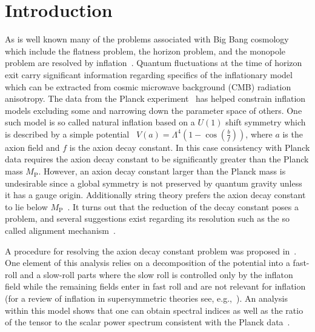 \documentclass[12pt]{article}
\begin{document}
\section{Introduction \label{sec:Introduction}}
As is well known many of the problems associated with Big Bang cosmology which include
the flatness problem, the horizon problem, and the monopole problem are resolved by inflation~\cite{Guth:1980zm, Starobinsky:1980te, Linde:1981mu, Albrecht:1982wi, Sato:1980yn, Linde:1983gd}.
Quantum fluctuations at the time of horizon exit carry significant information regarding specifics of the inflationary model~\cite{Mukhanov:1981xt, Hawking:1982cz, Starobinsky:1982ee, Guth:1982ec, Bardeen:1983qw, Cheung:2007st} which can be extracted from cosmic microwave background (CMB) radiation anisotropy.
The data from the Planck experiment~\cite{Adam:2015rua, Ade:2015lrj, Array:2015xqh} has helped constrain inflation models excluding some and narrowing down the parameter space of others.
One such model is so called natural inflation based on a $U(1)$ shift symmetry which is described by a simple potential~\cite{Freese:1990rb, Adams:1992bn} $V\left(a\right) = \Lambda^4 \left(1 - \cos(\frac{b}{f})\right)$, where $a$ is the axion field and $f$ is the axion decay constant.
In this case consistency with Planck data requires the axion decay constant to be significantly greater than the Planck mass $M_\text{P}$.
However, an axion decay constant larger than the Planck mass is undesirable since a global symmetry is not preserved by quantum gravity unless it has a gauge origin.
Additionally string theory prefers the axion decay constant to lie below $M_\text{P}$~\cite{Banks:2003sx, Svrcek:2006yi}.
It turns out that the reduction of the decay constant poses a problem, and several suggestions exist regarding its resolution such as the so called alignment mechanism~\cite{Kim:2004rp, Long:2014dta}.

A procedure for resolving the axion decay constant problem was proposed in~\cite{Nath:2017ihp}.
One element of this analysis relies on a decomposition of the potential into a fast-roll and a slow-roll parts where the slow roll is controlled only by the inflaton field while the remaining fields enter in fast roll and are not relevant for inflation~\cite{Nath:2017ihp} (for a review of inflation in supersymmetric theories see, e.g.,~\cite{Nath:2016qzm}).
An analysis within this model shows that one can obtain spectral indices as well as the ratio of the tensor to the scalar power spectrum consistent with the Planck data~\cite{Adam:2015rua, Ade:2015lrj, Array:2015xqh}.
\end{document}
